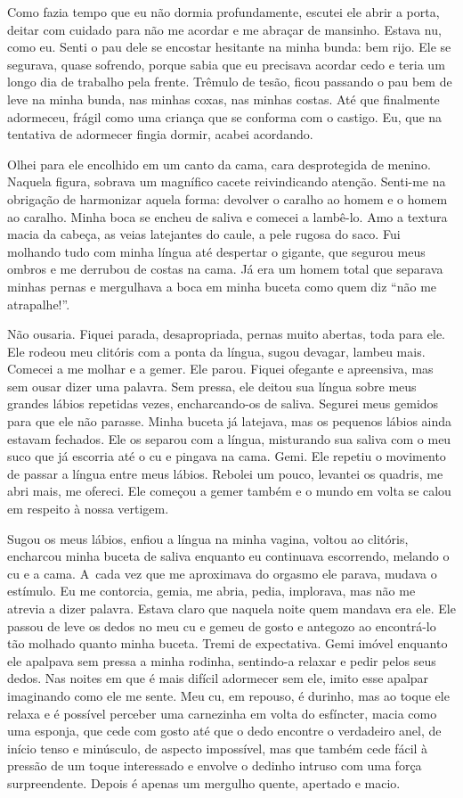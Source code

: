 Como fazia tempo que eu não dormia profundamente, escutei ele abrir a
porta, deitar com cuidado para não me acordar e me abraçar de mansinho.
Estava nu, como eu. Senti o pau dele se encostar hesitante na minha
bunda: bem rijo. Ele se segurava, quase sofrendo, porque sabia que eu
precisava acordar cedo e teria um longo dia de trabalho pela frente.
Trêmulo de tesão, ficou passando o pau bem de leve na minha bunda, nas
minhas coxas, nas minhas costas. Até que finalmente adormeceu, frágil
como uma criança que se conforma com o castigo. Eu, que na tentativa de
adormecer fingia dormir, acabei acordando.

Olhei para ele encolhido em um canto da cama, cara desprotegida de
menino. Naquela figura, sobrava um magnífico cacete reivindicando
atenção. Senti-me na obrigação de harmonizar aquela forma: devolver o
caralho ao homem e o homem ao caralho. Minha boca se encheu de saliva e
comecei a lambê-lo. Amo a textura macia da cabeça, as veias latejantes
do caule, a pele rugosa do saco. Fui molhando tudo com minha língua até
despertar o gigante, que segurou meus ombros e me derrubou de costas na
cama. Já era um homem total que separava minhas pernas e mergulhava a
boca em minha buceta como quem diz ``não me atrapalhe!''.

Não ousaria. Fiquei parada, desapropriada, pernas muito abertas, toda
para ele. Ele rodeou meu clitóris com a ponta da língua, sugou devagar,
lambeu mais. Comecei a me molhar e a gemer. Ele parou. Fiquei ofegante e
apreensiva, mas sem ousar dizer uma palavra. Sem pressa, ele deitou sua
língua sobre meus grandes lábios repetidas vezes, encharcando-os de
saliva. Segurei meus gemidos para que ele não parasse. Minha buceta já
latejava, mas os pequenos lábios ainda estavam fechados. Ele os separou
com a língua, misturando sua saliva com o meu suco que já escorria até o
cu e pingava na cama. Gemi. Ele repetiu o movimento de passar a língua
entre meus lábios. Rebolei um pouco, levantei os quadris, me abri mais,
me ofereci. Ele começou a gemer também e o mundo em volta se calou em
respeito à nossa vertigem.

Sugou os meus lábios, enfiou a língua na minha vagina, voltou ao
clitóris, encharcou minha buceta de saliva enquanto eu continuava
escorrendo, melando o cu e a cama. A~cada vez que me aproximava do
orgasmo ele parava, mudava o estímulo. Eu me contorcia, gemia, me abria,
pedia, implorava, mas não me atrevia a dizer palavra. Estava claro que
naquela noite quem mandava era ele. Ele passou de leve os dedos no meu
cu e gemeu de gosto e antegozo ao encontrá-lo tão molhado quanto minha
buceta. Tremi de expectativa. Gemi imóvel enquanto ele apalpava sem
pressa a minha rodinha, sentindo-a relaxar e pedir pelos seus dedos. Nas
noites em que é mais difícil adormecer sem ele, imito esse apalpar
imaginando como ele me sente. Meu cu, em repouso, é durinho, mas ao
toque ele relaxa e é possível perceber uma carnezinha em volta do
esfíncter, macia como uma esponja, que cede com gosto até que o dedo
encontre o verdadeiro anel, de início tenso e minúsculo, de aspecto
impossível, mas que também cede fácil à pressão de um toque interessado
e envolve o dedinho intruso com uma força surpreendente. Depois é apenas
um mergulho quente, apertado e macio.

